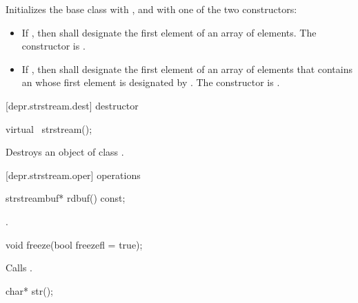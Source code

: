 \begin{itemdescr}
\pnum
\effects
Initializes the base class with ,
and  with one of the two constructors:
\begin{itemize}
\item
If
,
then  shall designate the first element of an array of  elements.
The constructor is
.
\item
If
,
then  shall
designate the first element of an array of  elements that contains
an \ntbs{} whose first element is designated by .
The constructor is
.
%
\end{itemize}
\end{itemdescr}

[depr.strstream.dest]{ destructor}

%
\begin{itemdecl}
virtual ~strstream();
\end{itemdecl}

\begin{itemdescr}
\pnum
\effects
Destroys an object of class
.
\end{itemdescr}

[depr.strstream.oper]{ operations}

%
\begin{itemdecl}
strstreambuf* rdbuf() const;
\end{itemdecl}

\begin{itemdescr}
\pnum
\returns
{}.
\end{itemdescr}

%
\begin{itemdecl}
void freeze(bool freezefl = true);
\end{itemdecl}

\begin{itemdescr}
\pnum
\effects
Calls
.
\end{itemdescr}

%
\begin{itemdecl}
char* str();
\end{itemdecl}

